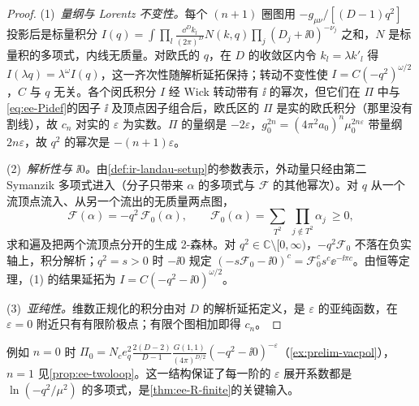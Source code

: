 \begin{proof}
(1)~\emph{量纲与 Lorentz 不变性。}每个 $(n+1)$ 圈图用 $-g_{\mu\nu}/[(D-1)q^2]$ 投影后是标量积分 $I(q)=\int\prod_l\frac{\dd^Dk_l}{(2\pi)^D}N(k,q)\prod_j(D_j+\ii0)^{-\nu_j}$ 之和，$N$ 是标量积的多项式，内线无质量。对欧氏的 $q$，在 $D$ 的收敛区内令 $k_l=\lambda k'_l$ 得 $I(\lambda q)=\lambda^\omega I(q)$，这一齐次性随解析延拓保持；转动不变性使 $I=C(-q^2)^{\omega/2}$，$C$ 与 $q$ 无关。各个闵氏积分 $I$ 经 Wick 转动带有 $\ii$ 的幂次，但它们在 $\Pi$ 中与\cref{eq:ee-Pidef}的因子 $\ii$ 及顶点因子组合后，欧氏区的 $\Pi$ 是实的欧氏积分（那里没有割线），故 $c_n$ 对实的 $\varepsilon$ 为实数。$\Pi$ 的量纲是 $-2\varepsilon$，$g_0^{2n}=(4\pi^2a_0)^n\mu_0^{2n\varepsilon}$ 带量纲 $2n\varepsilon$，故 $q^2$ 的幂次是 $-(n+1)\varepsilon$。

(2)~\emph{解析性与 $\ii0$。}由\cref{def:ir-landau-setup}的参数表示，外动量只经由第二 Symanzik 多项式进入（分子只带来 $\alpha$ 的多项式与 $\mathcal F$ 的其他幂次）。对 $q$ 从一个流顶点流入、从另一个流出的无质量两点图，
\begin{equation}\label{eq:ee-F0}
\mathcal F(\alpha)=-q^2\,\mathcal F_0(\alpha),\qquad \mathcal F_0(\alpha)=\sum_{T^2}\ \prod_{j\notin T^2}\alpha_j\ \ge0 ,
\end{equation}
求和遍及把两个流顶点分开的生成 2-森林\cite{Bogner:2010kv}。对 $q^2\in\mathbb C\setminus[0,\infty)$，$-q^2\mathcal F_0$ 不落在负实轴上，积分解析；$q^2=s>0$ 时 $-\ii0$ 规定 $(-s\mathcal F_0-\ii0)^c=\mathcal F_0^cs^c\ee^{-\ii\pi c}$。由恒等定理，(1) 的结果延拓为 $I=C(-q^2-\ii0)^{\omega/2}$。

(3)~\emph{亚纯性。}维数正规化的积分由对 $D$ 的解析延拓定义，是 $\varepsilon$ 的亚纯函数，在 $\varepsilon=0$ 附近只有有限阶极点\cite{tHooftVeltman1972,Collins1984}；有限个图相加即得 $c_n$。
\end{proof}
例如 $n=0$ 时 $\Pi_0=N_ce_q^2\frac{2(D-2)}{D-1}\frac{G(1,1)}{(4\pi)^{D/2}}(-q^2-\ii0)^{-\varepsilon}$（\cref{ex:prelim-vacpol}），$n=1$ 见\cref{prop:ee-twoloop}。这一结构保证了每一阶的 $\varepsilon$ 展开系数都是 $\ln(-q^2/\mu^2)$ 的多项式，是\cref{thm:ee-R-finite}的关键输入。

